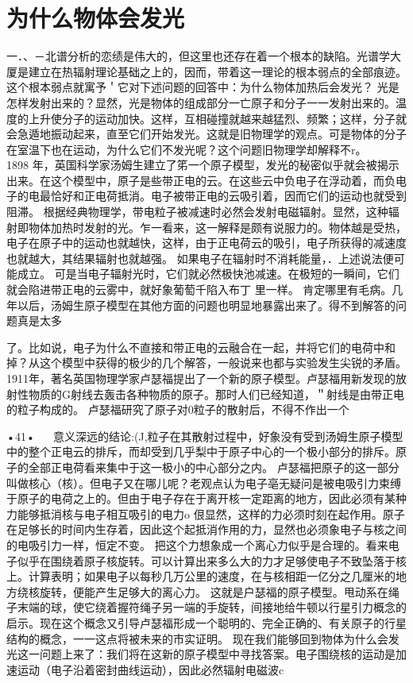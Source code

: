 \section{为什么物体会发光}

一．、－北谱分析的恋绩是伟大的，但这里也还存在着一个根本的缺陷。光谱学大厦是建立在热辐射理论基础之上的，因而，带着这一理论的根本弱点的全部痕迹。这个根本弱点就寓予＇它对下述问题的回答中：为什么物体加热后会发光？
光是怎样发射出来的？显然，光是物体的组成部分一亡原子和分子一一发射出来的。温度的上升使分子的运动加快。这样，互相碰撞就越来越猛烈、频繁；这样，分子就会急遁地振动起来，直至它们开始发光。这就是旧物理学的观点。可是物体的分子在室温下也在运动，为什么它们不发光呢？这个问题旧物理学却解释不r。
  
1898 年，英国科学家汤姆生建立了笫一个原子模型，发光的秘密似乎就会被揭示出来。在这个模型中，原子是些带正电的云。在这些云中负电子在浮动着，而负电子的电最恰好和正电荷抵消。电子被带正电的云吸引着，因而它们的运动也就受到阻滞。
根据经典物理学，带电粒子被减速时必然会发射电磁辐射。显然，这种辐射即物体加热时发射的光。乍一看来，这一解释是颇有说服力的。物体越是受热，电子在原子中的运动也就越快，这样，由于正电荷云的吸引，电子所获得的减速度也就越大，其结果辐射也就越强。
如果电子在辐射时不消耗能量，．上述说法便可能成立。
可是当电子辐射光时，它们就必然极快池减速。在极短的一瞬间，它们就会陷进带正电的云雾中，就好象葡萄千陷入布丁
里一样。
肯定哪里有毛病。几年以后，汤姆生原子模型在其他方面的问题也明显地暴露出来了。得不到解答的问题真是太多

了。比如说，电子为什么不直接和带正电的云融合在一起，并将它们的电荷中和掉？从这个模型中获得的极少的几个解答，一般说来也都与实验发生尖锐的矛盾。
1911年，著名英国物理学家卢瑟福提出了一个新的原子模型。卢瑟福用新发现的放射性物质的G射线去轰击各种物质的原子。那时人们已经知道，＂射线是由带正电的粒子构成的。
卢瑟福研究了原子对0粒子的散射后，不得不作出一个

•41•
  
意义深远的结论:(J,粒子在其散射过程中，好象没有受到汤姆生原子模型中的整个正电云的排斥，而却受到几乎梨中于原子中心的一个极小部分的排斥。原子的全部正电荷看来集中于这一极小的中心部分之内。
卢瑟福把原子的这一部分叫做核心（核）。但电子又在哪儿呢？老观点认为电子亳无疑问是被电吸引力束缚于原子的电荷之上的。但由于电子存在于离开核一定距离的地方，因此必须有某种力能够抵消核与电子相互吸引的电力o
佷显然，这样的力必须时刻在起作用。原子在足够长的时间内生存着，因此这个起抵消作用的力，显然也必须象电子与核之间的电吸引力一样，恒定不变。
把这个力想象成一个离心力似乎是合理的。看来电子似乎在围绕着原子核旋转。可以计算出来多么大的力才足够使电子不致坠落于核上。计算表明；如果电子以每秒几万公里的速度，在与核相距一亿分之几厘米的地方绕核旋转，便能产生足够大的离心力。
这就是户瑟福的原子模型。甩动系在绳子末端的球，使它绕着握符绳子另一端的手旋转，间接地给牛顿以行星引力概念的启示。现在这个概念又引导卢瑟福形成一个聪明的、完全正确的、有关原子的行星结构的概念，一一这点将被未来的市实证明。
现在我们能够回到物体为什么会发光这一问题上来了：我们将在这新的原子模型中寻找答案。电子围绕核的运动是加速运动（电子沿着密封曲线运动），因此必然辐射电磁波c

